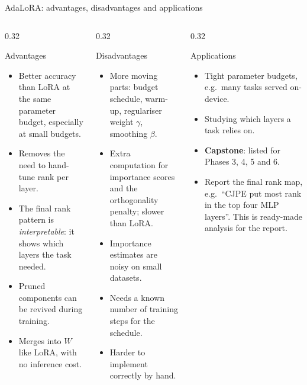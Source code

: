\documentclass[aspectratio=169,11pt]{beamer}
\begin{document}
\begin{frame}{AdaLoRA: advantages, disadvantages and applications}
  \begin{columns}[T]
    \begin{column}{0.32\textwidth}
      \begin{exampleblock}{Advantages}
        \scriptsize
        \begin{itemize}
          \item Better accuracy than LoRA at the same parameter budget, especially at small budgets.
          \item Removes the need to hand-tune rank per layer.
          \item The final rank pattern is \emph{interpretable}: it shows which layers the task needed.
          \item Pruned components can be revived during training.
          \item Merges into $W$ like LoRA, with no inference cost.
        \end{itemize}
      \end{exampleblock}
    \end{column}
    \begin{column}{0.32\textwidth}
      \begin{alertblock}{Disadvantages}
        \scriptsize
        \begin{itemize}
          \item More moving parts: budget schedule, warm-up, regulariser weight $\gamma$, smoothing $\beta$.
          \item Extra computation for importance scores and the orthogonality penalty; slower than LoRA.
          \item Importance estimates are noisy on small datasets.
          \item Needs a known number of training steps for the schedule.
          \item Harder to implement correctly by hand.
        \end{itemize}
      \end{alertblock}
    \end{column}
    \begin{column}{0.32\textwidth}
      \begin{block}{Applications}
        \scriptsize
        \begin{itemize}
          \item Tight parameter budgets, e.g.\ many tasks served on-device.
          \item Studying which layers a task relies on.
          \item \textbf{Capstone}: listed for Phases 3, 4, 5 and 6.
          \item Report the final rank map, e.g.\ ``CJPE put most rank in the top four MLP layers''. This is ready-made analysis for the report.
        \end{itemize}
      \end{block}
    \end{column}
  \end{columns}
\end{frame}
\end{document}

